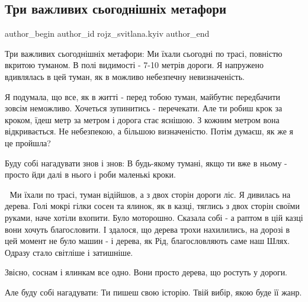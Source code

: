  
 
 
 
 
 
\subsection{Три важливих сьогоднішніх метафори}
\label{sec:11_12_2022.fb.rojz_svitlana.kyiv.1.metafory}
 
\ifcmt
 author_begin
   author_id rojz_svitlana.kyiv
 author_end
\fi

Три важливих сьогоднішніх метафори: Ми їхали сьогодні по трасі, повністю
вкритою туманом. В полі видимості - 7-10 метрів дороги. Я напружено вдивлялась
в цей туман, як в можливо небезпечну невизначеність. 

Я подумала, що все, як в житті - перед тобою туман, майбутнє передбачити зовсім
неможливо. Хочеться зупинитись - перечекати. Але ти робиш крок за кроком, їдеш
метр за метром і дорога стає яснішою. З кожним метром вона відкривається. Не
небезпекою, а більшою визначеністю. Потім думаєш, як же я це пройшла?

Буду собі нагадувати знов і знов: В будь-якому тумані, якщо ти вже в ньому -
просто йди далі в нього і роби маленькі кроки. 

🌲 Ми їхали по трасі, туман відійшов, а з двох сторін дороги ліс. Я дивилась на
дерева. Голі мокрі гілки сосен та ялинок, як в казці, тяглись з двох сторін
своїми руками, наче хотіли вхопити. Було моторошно. Сказала собі - а раптом в
цій казці вони хочуть благословити. І здалося, що дерева трохи нахилились, на
дорозі в цей момент не було машин - і дерева, як Рід, благословляють саме наш
Шлях. Одразу стало світліше і затишніше. 

Звісно, соснам і ялинкам все одно. Вони просто дерева, що ростуть у дороги.

Але буду собі нагадувати: Ти пишеш свою історію. Твій вибір, якою буде її жанр. 


